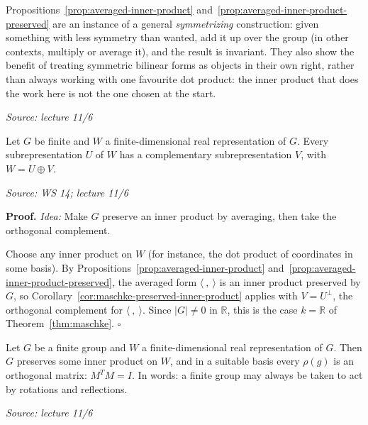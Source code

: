 \documentclass[11pt]{report}
\renewenvironment{proof}[1][Proof]{\noindent\textbf{#1.} }{\hfill$\square$\par\vspace{5pt}}
\newcommand{\srcline}[1]{\par\hfill{\footnotesize\textit{Source: #1}}}
\begin{document}
\begin{rembox}[{Symmetrizing}]\label{rem:symmetrizing}
Propositions~\ref{prop:averaged-inner-product} and~\ref{prop:averaged-inner-product-preserved} are an instance of a general \emph{symmetrizing} construction: given something with less symmetry than wanted, add it up over the group (in other contexts, multiply or average it), and the result is invariant. They also show the benefit of treating symmetric bilinear forms as objects in their own right, rather than always working with one favourite dot product: the inner product that does the work here is not the one chosen at the start.
\srcline{lecture 11/6}
\end{rembox}

\begin{corbox}\label{cor:maschke-real}
Let $G$ be finite and $W$ a finite-dimensional real representation of $G$. Every subrepresentation $U$ of $W$ has a complementary subrepresentation $V$, with $W = U \oplus V$.
\srcline{WS 14; lecture 11/6}
\end{corbox}

\begin{proof}
\textit{Idea:} Make $G$ preserve an inner product by averaging, then take the orthogonal complement.\par
Choose any inner product on $W$ (for instance, the dot product of coordinates in some basis). By Propositions~\ref{prop:averaged-inner-product} and~\ref{prop:averaged-inner-product-preserved}, the averaged form $\langle\ ,\ \rangle$ is an inner product preserved by $G$, so Corollary~\ref{cor:maschke-preserved-inner-product} applies with $V = U^\perp$, the orthogonal complement for $\langle\ ,\ \rangle$. Since $|G| \neq 0$ in $\mathbb{R}$, this is the case $k = \mathbb{R}$ of Theorem~\ref{thm:maschke}.
\end{proof}

\begin{corbox}\label{cor:orthogonal-matrices}
Let $G$ be a finite group and $W$ a finite-dimensional real representation of $G$. Then $G$ preserves some inner product on $W$, and in a suitable basis every $\rho(g)$ is an orthogonal matrix: $M^T M = I$. In words: a finite group may always be taken to act by rotations and reflections.
\srcline{lecture 11/6}
\end{corbox}
\end{document}
